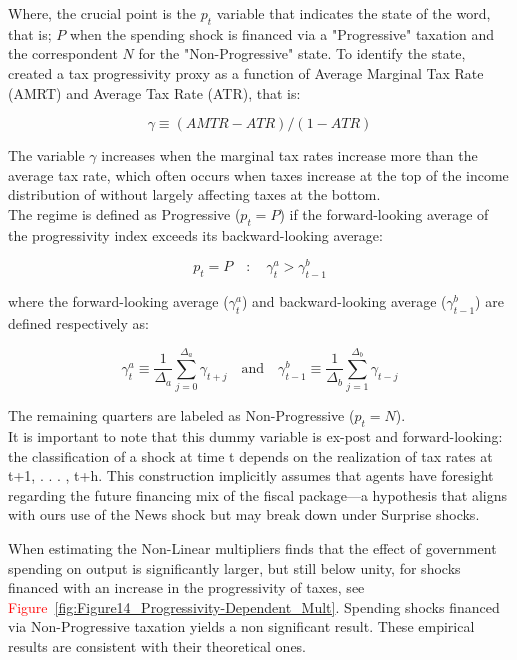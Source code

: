 \documentclass[12pt,letterpaper]{article}
\begin{document}
Where, the crucial point is the $p_t$ variable that indicates the state of the word, that is; $P$ when the spending shock is financed via a "Progressive" taxation and the correspondent $N$ for the "Non-Progressive" state.
To identify the state, \cite{FN} created a tax progressivity proxy as a function of  Average Marginal Tax Rate (AMRT) and Average Tax Rate (ATR), that is:

\begin{equation}
    \gamma \equiv (AMTR - ATR)/(1-ATR)
    \label{eq:Gamma_FN}
\end{equation}

The variable $\gamma$ increases when the marginal tax rates increase more than the average tax rate, which often occurs when taxes increase at the top of the income distribution of without largely affecting taxes at the bottom.
\\
The regime is defined as Progressive ($p_t = P$) if the forward-looking average of the progressivity index exceeds its backward-looking average:

\begin{equation}
    p_t = P \quad : \quad \gamma^a_t > \gamma^b_{t-1}
\end{equation}

where the forward-looking average ($\gamma^a_t$) and backward-looking average ($\gamma^b_{t-1}$) are defined respectively as:

\begin{equation}
    \gamma^a_t \equiv \frac{1}{\Delta_a} \sum_{j=0}^{\Delta_a} \gamma_{t+j} \quad \text{and} \quad \gamma^b_{t-1} \equiv \frac{1}{\Delta_b} \sum_{j=1}^{\Delta_b} \gamma_{t-j}
\end{equation}

The remaining quarters are labeled as Non-Progressive ($p_t = N$).
\\
It is important to note that this dummy variable is
ex-post and forward-looking: the classification of a shock at time t depends on the
realization of tax rates at t+1, . . . , t+h. This construction implicitly assumes that agents
have foresight regarding the future financing mix of the fiscal package—a hypothesis that
aligns with ours use of the News shock but may break down under Surprise shocks.


When estimating the Non-Linear multipliers \cite{FN} finds that the effect of government spending on output is significantly larger, but still below unity, for shocks financed with an increase in the progressivity of taxes, see \textcolor{red}{Figure~\ref{fig:Figure14_Progressivity-Dependent_Mult}}. Spending shocks financed via Non-Progressive taxation yields a non significant result.
These empirical results are consistent with their theoretical ones.
\end{document}
